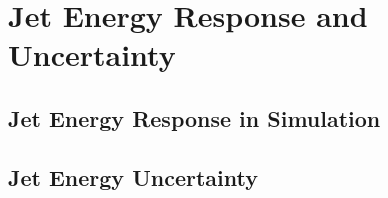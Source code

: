 \chapter{Jet Energy Response and Uncertainty}

\label{ch:jes}

\section{Jet Energy Response in Simulation}


\section{Jet Energy Uncertainty}

